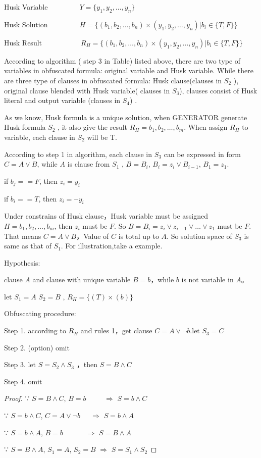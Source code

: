 \documentclass[runningheads,a4paper]{llncs}
\begin{document}
Husk Variable~~~~~~~~~$Y=\{y_1,y_2,\dots,y_n \}$

Husk Solution~~~~~~~~~$H=\{(b_1,b_2,\dots,b_n)\times(y_1,y_2,\dots,y_n) | b_i∈ \{T,F\}\}$

Husk Result~~~~~~~~~~~$R_H=\{(b_1,b_2,\dots,b_n)\times(y_1,y_2,\dots,y_n)| b_i∈ \{T,F\}\}$

According to algorithm ( step 3 in Table) listed above, there are two type of variables in obfuscated formula: original variable and Husk variable. 
While there are three type of clauses in obfuscated formula: Husk clause(clauses in $S_2$ ),
original clause blended with Husk variable( clauses in $S_3$),
clauses consist of Husk literal and output variable (clauses in $S_4$) .

As we know, Husk formula is a unique solution, when GENERATOR generate Husk formula $S_2$ , it also give the result $R_H={b_1,b_2,\dots,b_m}$. When assign $R_H$ to variable, each clause in $S_2$ will be T.

According to step 1 in algorithm, each clause in $S_3$ can be expressed in form $C=A\vee B$, while $A$ is clause from $S_1$ , $B=B_i$, $B_i=z_i\vee B_{i-1}$, $B_1= z_1$.

if $b_j==F$, then $z_i =y_i$

if $b_i==T$, then $z_i = \neg y_i$

Under constrains of Husk clause，Husk variable must be assigned $H={b_1,b_2,\dots,b_m}$, then $z_i$ must be $F$. So $B=B_i=z_i\vee z_{i-1}\vee\dots\vee z_1$ must be $F$. 
That means $C=A\vee B$，Value of $C$ is total up to $A$. So solution space of $S_3$ is same as that of $S_1$. For illustration,take a example.

\noindent Hypothesis:

clause $A$ and clause with unique variable $B=b$，while $b$ is not variable in $A$。

let $S_1=A$  $S_2=B$ , $R_H=\{(T)\times(b)\}$

\noindent Obfuscating procedure:

Step 1. according to $R_H$ and rules 1，get clause $C=A\vee \neg b$.let $S_3=C$

Step 2. (option) omit

Step 3. let $S=S_2\wedge S_3$ ，then $S=B\wedge C$

Step 4. omit

\begin{proof}

∵ $S=B\wedge C$, $B=b$ $~~~~~~~~~~\Longrightarrow$ $S=b\wedge C$   

∵ $S=b\wedge C$, $C=A\vee \neg b$ $~~~~~\Longrightarrow$ $S=b\wedge A$  

∵ $S=b\wedge A$, $B=b$ $~~~~~~~~~~~~~\Longrightarrow$ $S=B\wedge A$

∵ $S=B\wedge A$, $S_1 =A$, $S_2=B$ $\Longrightarrow$ $S=S_1\wedge S_2$ 
\end{proof}
\end{document}
